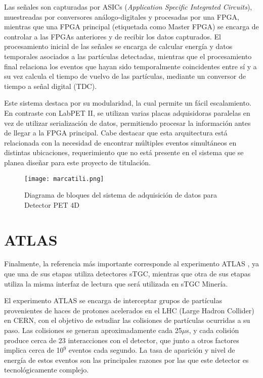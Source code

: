 	Las señales son capturadas por ASICs (\textit{Application Specific Integrated Circuits}), muestreadas por conversores análogo-digitales y procesadas por una FPGA, mientras que una FPGA principal (etiquetada como Master FPGA) se encarga de controlar a las FPGAs anteriores y de recibir los datos capturados. El procesamiento inicial de las señales se encarga de calcular energía y datos temporales asociados a las partículas detectadas, mientras que el procesamiento final relaciona los eventos que hayan sido temporalmente coincidentes entre sí y a su vez calcula el tiempo de vuelvo de las partículas, mediante un conversor de tiempo a señal digital (TDC).
	       	
	Este sistema destaca por su modularidad, la cual permite un fácil escalamiento. En contraste con LabPET II, se utilizan varias placas adquisidoras paralelas en vez de utilizar serialización de datos, permitiendo procesar la información antes de llegar a la FPGA principal. Cabe destacar que esta arquitectura está relacionada con la necesidad de encontrar múltiples eventos simultáneos en distintas ubicaciones, requerimiento que no está presente en el sistema que se planea diseñar para este proyecto de titulación. 
	
	\begin{figure}[h]
		\centering
		\texttt{[image: marcatili.png]}
		\caption{Diagrama de bloques del sistema de adquisición de datos para Detector PET 4D \cite{Marcatili2011DevelopmentDetector}}
		\label{fig:marcatili}
	\end{figure}
	
\newpage
\section{ATLAS}
\label{sec:atlas}
	Finalmente, la referencia más importante corresponde al experimento ATLAS \cite{Spieler2012ElectronicsAcquisition}, ya que una de sus etapas utiliza detectores sTGC, mientras que otra de sus etapas utiliza la misma interfaz de lectura que será utilizada en sTGC Minería.

	El experimento ATLAS se encarga de interceptar grupos de partículas provenientes de haces de protones acelerados en el LHC (Large Hadron Collider) en CERN, con el objetivo de estudiar las colisiones de partículas ocurridas a su paso. Las colisiones se generan aproximadamente cada 25$\mu$s\cite{Whiteson2016TheSystem}, y cada colisión produce cerca de 23 interacciones con el detector, que junto a otros factores implica cerca de 10$^9$ eventos cada segundo. La tasa de aparición y nivel de energía de estos eventos son las principales razones por las que este detector es tecnológicamente complejo.
	

